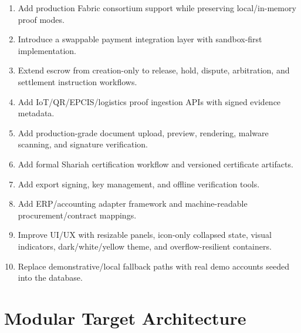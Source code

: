 \documentclass[11pt]{article}
\begin{document}
\begin{enumerate}
  \item Add production Fabric consortium support while preserving local/in-memory proof modes.
  \item Introduce a swappable payment integration layer with sandbox-first implementation.
  \item Extend escrow from creation-only to release, hold, dispute, arbitration, and settlement instruction workflows.
  \item Add IoT/QR/EPCIS/logistics proof ingestion APIs with signed evidence metadata.
  \item Add production-grade document upload, preview, rendering, malware scanning, and signature verification.
  \item Add formal Shariah certification workflow and versioned certificate artifacts.
  \item Add export signing, key management, and offline verification tools.
  \item Add ERP/accounting adapter framework and machine-readable procurement/contract mappings.
  \item Improve UI/UX with resizable panels, icon-only collapsed state, visual indicators, dark/white/yellow theme, and overflow-resilient containers.
  \item Replace demonstrative/local fallback paths with real demo accounts seeded into the database.
\end{enumerate}

\section{Modular Target Architecture}
\end{document}
